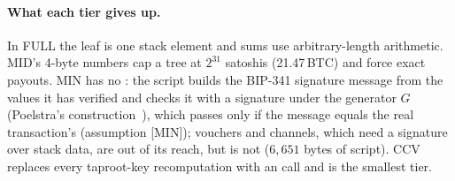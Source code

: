 \paragraph{What each tier gives up.} In FULL the leaf is one stack
element and sums use arbitrary-length arithmetic. MID's 4-byte numbers
cap a tree at $2^{31}$ satoshis (21.47\,BTC) and force exact payouts.
MIN has no : the script builds the BIP-341 signature message from
the values it has verified and checks it with a signature under the
generator $G$ (Poelstra's construction~\cite{catschnorr}), which passes
only if the message equals the real transaction's (assumption [MIN]);
vouchers and channels, which need a signature over stack data, are out
of its reach, but  is not ($6{,}651$ bytes of script). CCV
replaces every taproot-key recomputation with an
 call and is the smallest tier.
\fi
